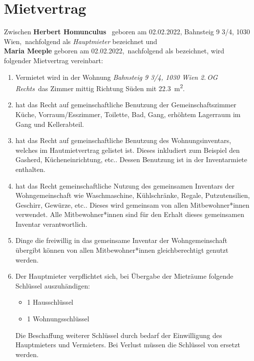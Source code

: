 \documentclass{scrreprt}[12pt,a4paper,twoside,duplex]
\newcommand{\hauptmieterName}{Herbert Homunculus}
\newcommand{\hauptmieterAddresse}{Bahnsteig 9 3/4, 1030 Wien}
\newcommand{\hauptmieterGebTag}{02.02.2022}
\newcommand{\untermieterName}{Maria Meeple}
\newcommand{\untermieterGebTag}{02.02.2022}
\newcommand{\mietObjekt}{\textsl{Bahnsteig 9 3/4, 1030 Wien 2.\,OG Rechts}}
\begin{document}
\chapter*{Mietvertrag}
\large{Zwischen \textbf{\hauptmieterName} \ geboren am \hauptmieterGebTag, \hauptmieterAddresse ,\ nachfolgend als \textsl{Hauptmieter} bezeichnet und \\ \textbf{\untermieterName} geboren am \untermieterGebTag ,\ nachfolgend als \textsl{} bezeichnet, wird folgender Mietvertrag vereinbart:}

\begin{contract}
\label{clause:mietsache}

\begin{enumerate}
	\item Vermietet wird in der Wohnung \mietObjekt \ das Zimmer mittig Richtung Süden mit \SI{22.3}{\square \meter}. \label{itm:zimmer}

	\item {} hat das Recht auf gemeinschaftliche Benutzung der Gemeinschaftszimmer Küche, Vorraum/Esszimmer, Toilette, Bad, Gang, erhöhtem Lagerraum im Gang und Kellerabteil. \label{itm:gemeinschaftsZimmer}
	
	\item {} hat das Recht auf gemeinschaftliche Benutzung des Wohnungsinventars, welches im Hautmietvertrag gelistet ist. Dieses inkludiert zum Beispiel den Gasherd, Kücheneinrichtung, etc.. Dessen Benutzung ist in der Inventarmiete enthalten.\label{itm:inventar}

	\item {} hat das Recht gemeinschaftliche Nutzung des gemeinsamen Inventars der Wohngemeinschaft wie Waschmaschine, Kühlschränke, Regale, Putzutensilien, Geschirr, Gewürze, etc.. Dieses wird gemeinsam von allen Mitbewohner*innen verwendet. Alle Mitbewohner*innen sind für den Erhalt dieses gemeinsamen Inventar verantwortlich.
	
	\item Dinge die  freiwillig in das gemeinsame Inventar der Wohngemeinschaft übergibt können von allen Mitbewohner*innen gleichberechtigt genutzt werden.

	\item Der Hauptmieter verpflichtet sich,  bei Übergabe der Mieträume
	folgende Schlüssel auszuhändigen:
	\begin{itemize}
	  \item 1 Hausschlüssel
	  \item 1 Wohnungsschlüssel
	\end{itemize}
	Die Beschaffung weiterer Schlüssel durch  bedarf der Einwilligung des
	Hauptmieters und Vermieters. Bei Verlust müssen die Schlüssel von  ersetzt werden.
\end{enumerate}
\end{contract}
\end{document}
